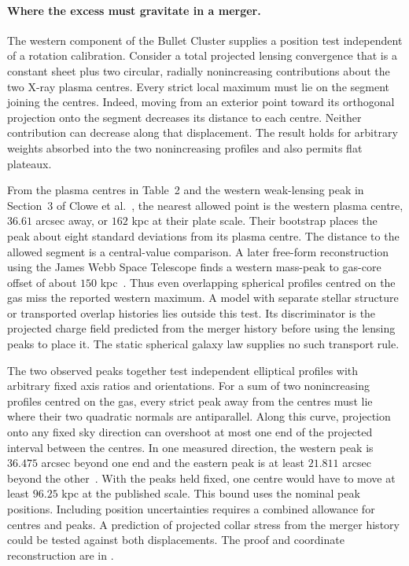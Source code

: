 \documentclass[11pt]{article}
\begin{document}
\paragraph{Where the excess must gravitate in a merger.}
The western component of the Bullet Cluster supplies a position test
independent of a rotation calibration. Consider a total projected
lensing convergence that is a constant sheet plus two circular,
radially nonincreasing contributions about the two X-ray plasma centres.
Every strict local maximum must lie on the segment joining the centres.
Indeed, moving from an exterior point toward its orthogonal projection
onto the segment decreases its distance to each centre. Neither
contribution can decrease along that displacement. The result holds
for arbitrary weights absorbed into the two nonincreasing profiles
and also permits flat plateaux.

From the plasma centres in Table~2 and the western weak-lensing peak
in Section~3 of Clowe et al.~\cite{clowe2006}, the nearest allowed
point is the western plasma centre, $36.61$ arcsec away, or $162$ kpc
at their plate scale. Their bootstrap places the peak about eight
standard deviations from its plasma centre. The distance to the
allowed segment is a central-value comparison. A later free-form
reconstruction using the James Webb Space Telescope finds a western
mass-peak to gas-core offset of about $150$ kpc~\cite{cha2025}.
Thus even overlapping spherical profiles centred on the gas miss the
reported western maximum. A model with separate stellar structure or
transported overlap histories lies outside this test. Its discriminator
is the projected charge field predicted from the merger history before
using the lensing peaks to place it. The static spherical galaxy law
supplies no such transport rule.

The two observed peaks together test independent elliptical profiles
with arbitrary fixed axis ratios and orientations. For a sum of two
nonincreasing profiles centred on the gas, every strict peak away
from the centres must lie where their two quadratic normals are
antiparallel. Along this curve, projection onto any fixed sky direction
can overshoot at most one end of the projected interval between the
centres. In one measured direction, the western peak is $36.475$ arcsec
beyond one end and the eastern peak is at least $21.811$ arcsec beyond
the other~\cite{clowe2006}. With the peaks held fixed, one centre would
have to move at least $96.25$ kpc at the published scale. This bound
uses the nominal peak positions. Including position uncertainties
requires a combined allowance for centres and peaks. A prediction of
projected collar stress from the merger history could be tested against
both displacements. The proof and coordinate reconstruction are in
.
\end{document}

